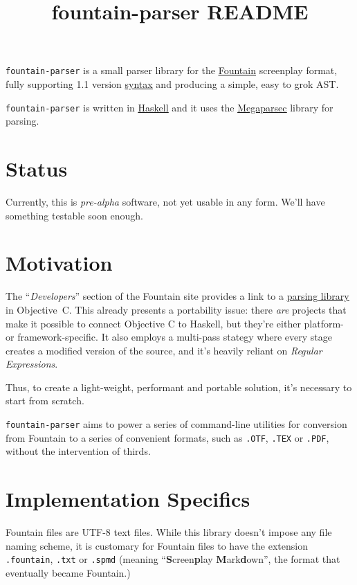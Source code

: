 \documentclass[12pt]{article}
\newcommand{\link}[2]{\underline{\color{darkblue}\href{#1}{#2}}}
\begin{document}
\title{\textbf{fountain-parser README}}
\author{}
\date{}
\maketitle

\texttt{fountain-parser} is a small parser library for the
\link{https://fountain.io/}{\textsf{Fountain}} screenplay format,
fully supporting 1.1 version
\link{https://fountain.io/syntax/}{syntax} and
producing a simple, easy to grok \textsf{AST}.

\texttt{fountain-parser} is written in
\link{https://haskell.org}{\textsf{Haskell}} and it uses the
\link{https://hackage.haskell.org/package/megaparsec}{\textsf{Megaparsec}}
library for parsing.

\section{Status}
Currently, this is \emph{pre-alpha} software, not yet usable in
any form. We'll have something testable soon enough.

\section{Motivation}
The ``\emph{Developers}'' section of the Fountain site provides a
link to a
\link{https://github.com/nyousefi/Fountain}{parsing library}
in \textsf{Objective~C}. This already presents a portability
issue: there \emph{are} projects that make it possible to connect
Objective C to Haskell, but they're either platform- or
framework-specific.  It also employs a multi-pass stategy where
every stage creates a modified version of the source, and it's
heavily reliant on \emph{Regular Expressions}.

Thus, to create a light-weight, performant and portable
solution, it's necessary to start from scratch.

\texttt{fountain-parser} aims to power a series of command-line
utilities for conversion from Fountain to a series of convenient
formats, such as \texttt{.OTF}, \texttt{.TEX} or \texttt{.PDF},
without the intervention of thirds.

\section{Implementation Specifics}
Fountain files are \textsf{UTF-8} text files. While this library
doesn't impose any file naming scheme, it is customary for Fountain
files to have the extension \texttt{.fountain}, \texttt{.txt} or
\texttt{.spmd} (meaning
``\textbf{S}creen\textbf{p}lay \textbf{M}ark\textbf{d}own'',
the format that eventually became Fountain.)
\end{document}
